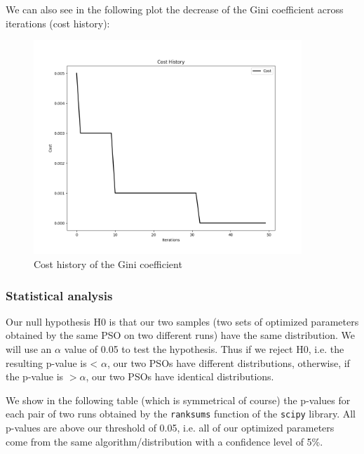             We can also see in the following plot the decrease of the Gini coefficient across iterations (cost history):

            \begin{figure}[H]
                \centering
                \includegraphics[width=0.9\textwidth]{img/opti/costHistoryGini.png}
                \caption{Cost history of the Gini coefficient}
        \end{figure}

        \subsubsection{Statistical analysis}
        
            Our null hypothesis H0 is that our two samples (two sets of optimized parameters obtained by the same PSO on two different runs) have the same distribution. We will use an $\alpha$ value of 0.05 to test the hypothesis. Thus if we reject H0, i.e. the resulting p-value is < $\alpha$, our two PSOs have different distributions, otherwise, if the p-value is $> \alpha$, our two PSOs have identical distributions.

            We show in the following table (which is symmetrical of course) the p-values for each pair of two runs obtained by the \texttt{ranksums} function of the \texttt{scipy} library. All p-values are above our threshold of 0.05, i.e. all of our optimized parameters come from the same algorithm/distribution with a confidence level of 5\%.


